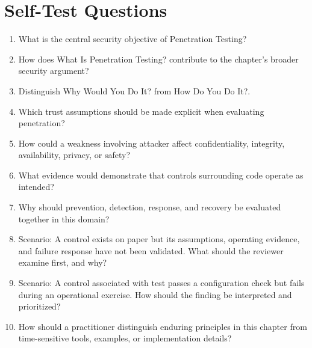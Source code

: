 \documentclass[11pt]{article}
\begin{document}
\section*{Self-Test Questions}
\begin{enumerate}
\item What is the central security objective of Penetration Testing?
\item How does What Is Penetration Testing? contribute to the chapter's broader security argument?
\item Distinguish Why Would You Do It? from How Do You Do It?.
\item Which trust assumptions should be made explicit when evaluating penetration?
\item How could a weakness involving attacker affect confidentiality, integrity, availability, privacy, or safety?
\item What evidence would demonstrate that controls surrounding code operate as intended?
\item Why should prevention, detection, response, and recovery be evaluated together in this domain?
\item Scenario: A control exists on paper but its assumptions, operating evidence, and failure response have not been validated. What should the reviewer examine first, and why?
\item Scenario: A control associated with test passes a configuration check but fails during an operational exercise. How should the finding be interpreted and prioritized?
\item How should a practitioner distinguish enduring principles in this chapter from time-sensitive tools, examples, or implementation details?
\end{enumerate}
\end{document}
